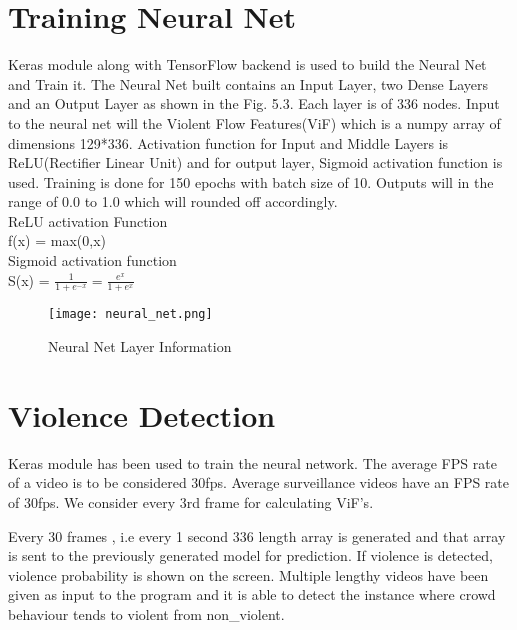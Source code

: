 \section{Training Neural Net}
Keras module along with TensorFlow backend is used to build the Neural Net and Train it. The Neural Net built contains an Input Layer, two Dense Layers and an Output Layer as shown in the Fig. 5.3. Each layer is of 336 nodes. Input to the neural net will the Violent Flow Features(ViF) which is a numpy array of dimensions 129*336. Activation function for Input and Middle Layers is ReLU(Rectifier Linear Unit) and for output layer, Sigmoid activation function is used. Training is done for 150 epochs with batch size of 10. Outputs will in the range of 0.0 to 1.0 which will rounded off accordingly. \\
ReLU activation Function \\
f(x) = max(0,x)\\
Sigmoid activation function \\
S(x) = $\frac{1}{1+e^{-x}} = \frac{e^x}{1+e^x}$
\begin{center}
\begin{figure}[H]
\centering
\texttt{[image: neural\_net.png]}
\caption{Neural Net Layer Information}
\end{figure}
\end{center}
\section{Violence Detection}
Keras module has been used to train the neural network. The average FPS rate of a video is to be considered 30fps. Average surveillance videos have an FPS rate of 30fps. We consider every 3rd frame for calculating ViF’s. 
\par
	Every 30 frames , i.e every 1 second 336 length array is generated and that array is sent to the previously generated model for prediction. If violence is detected, violence probability is shown on the screen. Multiple lengthy videos have been given as input to the program and it is able to detect the instance where crowd behaviour tends to violent from non\_violent.


